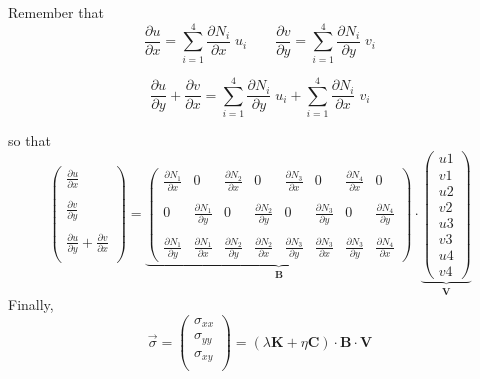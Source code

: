 Remember that
\[
\frac{\partial u}{\partial x} = \sum_{i=1}^4 \frac{\partial N_i}{\partial x}\;  u_i 
\quad\quad
\frac{\partial v}{\partial y} = \sum_{i=1}^4 \frac{\partial N_i}{\partial y}\;  v_i 
\]

\[
\frac{\partial u}{\partial y} 
+\frac{\partial v}{\partial x} 
= \sum_{i=1}^4 \frac{\partial N_i}{\partial y}\;  u_i
+ \sum_{i=1}^4 \frac{\partial N_i}{\partial x}\;  v_i
\]

so that
\[
\left(
\begin{array}{c}
\frac{\partial u}{\partial x} \\ \\
\frac{\partial v}{\partial y} \\ \\
\frac{\partial u}{\partial y} + \frac{\partial v}{\partial x} \\
\end{array}
\right)
=
\underbrace{
\left(
\begin{array}{cccccccc}
\frac{\partial N_1}{\partial x} & 0 & \frac{\partial N_2}{\partial x} & 0 & \frac{\partial N_3}{\partial x} & 0 & \frac{\partial N_4}{\partial x} & 0 \\  \\
0 & \frac{\partial N_1}{\partial y} & 0 & \frac{\partial N_2}{\partial y} & 0 & \frac{\partial N_3}{\partial y} & 0 & \frac{\partial N_4}{\partial y}  \\ \\
\frac{\partial N_1}{\partial y} &  \frac{\partial N_1}{\partial x} &  \frac{\partial N_2}{\partial y} &  \frac{\partial N_2}{\partial x} & 
\frac{\partial N_3}{\partial y} &  \frac{\partial N_3}{\partial x} &  \frac{\partial N_3}{\partial y} &  \frac{\partial N_4}{\partial x}  
\end{array}
\right)
}_{\bm B}
\cdot
\underbrace{
\left(
\begin{array}{c}
u1 \\ v1 \\ u2 \\ v2 \\ u3 \\ v3 \\ u4 \\ v4
\end{array}
\right)
}_{\bm V}
\]
Finally,
\[
\vec{\sigma}=
\left(
\begin{array}{c}
\sigma_{xx}\\
\sigma_{yy}\\
\sigma_{xy}\\
\end{array}
\right)
=
(\lambda {\bm K} +  \eta {\bm C} )\cdot {\bm B} \cdot {\bm V}
\]

